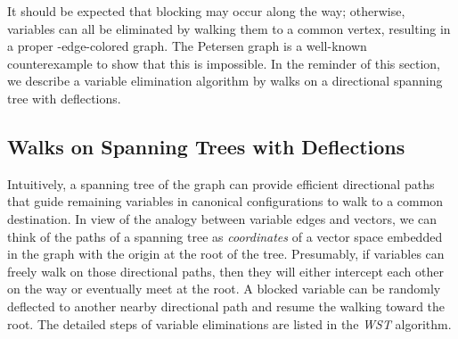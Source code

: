 \documentclass[11pt]{article}
\begin{document}
It should be expected that blocking may occur along the way; otherwise, variables can all be eliminated by walking them to a common vertex, resulting in a proper -edge-colored graph. The Petersen graph is a well-known counterexample to show that this is impossible. In the reminder of this section, we describe a variable elimination algorithm by walks on a directional spanning tree with deflections.


\subsection{Walks on Spanning Trees with Deflections}
Intuitively, a spanning tree of the graph  can provide efficient directional paths that guide remaining variables in canonical configurations to walk to a common destination. In view of the analogy between variable edges and vectors, we can think of the paths of a spanning tree as {\it coordinates} of a vector space embedded in the graph  with the origin at the root of the tree. Presumably, if variables can freely walk on those directional paths, then they will either intercept each other on the way or eventually meet at the root. A blocked variable can be randomly deflected to another nearby directional path and resume the walking toward the root. The detailed steps of variable eliminations are listed in the {\it WST} algorithm.
\end{document}
